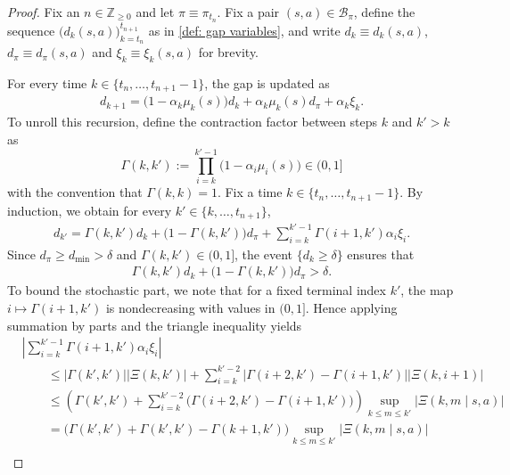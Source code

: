 \begin{proof}
Fix an $n \in \mathbb Z_{\ge 0}$
and let $\pi \equiv \pi_{t_n}$.
Fix a pair $(s,a) \in \mathcal B_\pi$,
define the sequence $\big( d_k(s,a) \big)_{k=t_n}^{t_{n+1}}$ as in \autoref{def: gap variables}, and write $d_k \equiv d_k(s,a)$, $d_\pi \equiv d_\pi(s,a)$ and $\xi_k \equiv \xi_k(s,a)$ for brevity.

For every time $k \in \{t_n, \dots, t_{n+1}-1\}$, the gap is updated as
\begin{align*}
d_{k+1}
=
\big( 1 - \alpha_{k} \mu_{k}(s) \big) d_{k} + \alpha_{k} \mu_{k}(s) d_\pi + \alpha_{k} \xi_{k} .
\end{align*}
To unroll this recursion, define the contraction factor between steps $k$ and $k'>k$ as
\[
\Gamma(k,k') := \prod_{i=k}^{k'-1} \big( 1 - \alpha_{i} \mu_{i}(s) \big) \in(0,1]
\]
with the convention that $\Gamma(k,k) = 1$.
Fix a time $k \in \{t_n, \dots, t_{n+1}-1\}$.
By induction, we obtain for every $k' \in \{k,\dots,t_{n+1}\}$,
\begin{align}
\label{eq: induction for abel proof}  
d_{k'}
=
\Gamma(k,k') d_{k}
+
\bigl(1-\Gamma(k,k') \bigr) d_\pi
+ \sum_{i=k}^{k'-1} \Gamma(i+1,k') \alpha_i \xi_i .
\end{align}
Since $d_\pi \ge d_{\min} > \delta$ and $\Gamma(k,k') \in (0,1]$, the event $\{d_{k} \ge \delta\}$ ensures that
\begin{align}
\label{eq: lower obund for abel proof}
\Gamma(k,k') d_{k} + \big(1-\Gamma(k,k')\big) d_\pi > \delta.
\end{align}
To bound the stochastic part, we note that for a fixed terminal index $k'$, the map $i \mapsto \Gamma(i+1,k')$ is nondecreasing with values in $(0,1]$.
Hence applying summation by parts and the triangle inequality yields
\begin{align}
\nonumber
&\left|
\sum_{i=k}^{k'-1} \Gamma(i+1,k') \alpha_i \xi_i
\right|
\\
\nonumber
&\qquad\le
\big| \Gamma(k',k') \big| \big| \Xi(k,k') \big| + \sum_{i=k}^{k'-2} \big| \Gamma(i+2,k') - \Gamma(i+1,k') \big| \big| \Xi(k, i+1) \big|
\\
\nonumber
&\qquad\le
\left( \Gamma(k',k') + \sum_{i=k}^{k'-2} \big( \Gamma(i+2,k') - \Gamma(i+1,k') \big) \right)
\sup_{k \le m \le k'} \bigl| \Xi(k,m\mid s,a) \bigr|
\\
\nonumber
&\qquad=
\big( \Gamma(k',k') + \Gamma(k',k') - \Gamma(k+1,k') \big)
\sup_{k \le m \le k'} \bigl| \Xi(k,m\mid s,a) \bigr|
\\

\end{align}
\end{proof}
